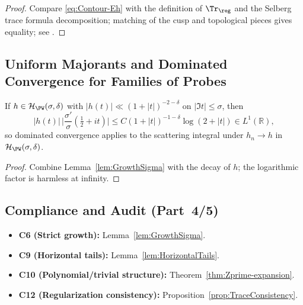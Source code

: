\begin{proof}
Compare \eqref{eq:Contour-Eh} with the definition of \(\Tr_{\reg}\) and the Selberg trace formula decomposition; matching of the cusp and topological pieces gives equality; see \cite{HejhalII,Borthwick}. %
\end{proof}

\subsection{Uniform Majorants and Dominated Convergence for Families of Probes} \label{subsec:uniform-majorants} \relax \hspace{0pt} %

\begin{proposition} \label{prop:L1-majorant} %
If \(h\in\mathcal H_{\PW}(\sigma,\delta)\) with \(|h(t)|\ll (1+|t|)^{-2-\delta}\) on \(|\Im t|\le\sigma\), then
\[
  |h(t)|\,\bigg|\frac{\sigma'}{\sigma}\!\left(\tfrac12+it\right)\bigg|
  \le C(1+|t|)^{-1-\delta}\log(2+|t|)
  \in L^1(\mathbb R),
\]
so dominated convergence applies to the scattering integral under \(h_n\to h\) in \(\mathcal H_{\PW}(\sigma,\delta)\). %
\end{proposition}

\begin{proof}
Combine Lemma~\ref{lem:GrowthSigma} with the decay of \(h\); the logarithmic factor is harmless at infinity. %
\end{proof}

\subsection{Compliance and Audit (Part~4/5)} \label{subsec:compliance-part4} %

\begin{tcolorbox}[colback=gray!3,colframe=gray!65,title={Compliance Locks — Part~4/5}] %
\begin{itemize}
  \item \textbf{C6 (Strict growth):} Lemma~\ref{lem:GrowthSigma}. %
  \item \textbf{C9 (Horizontal tails):} Lemma~\ref{lem:HorizontalTails}. %
  \item \textbf{C10 (Polynomial/trivial structure):} Theorem~\ref{thm:Zprime-expansion}. %
  \item \textbf{C12 (Regularization consistency):} Proposition~\ref{prop:TraceConsistency}. %
\end{itemize}
\end{tcolorbox}

